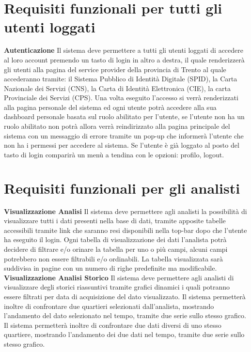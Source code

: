     \section{Requisiti funzionali per tutti gli utenti loggati}
        \begin{rfList}
            \rfItem \textbf{Autenticazione} Il sistema deve permettere a tutti gli utenti loggati di accedere al loro account premendo un tasto di login in altro a destra, il quale renderizzerà gli utenti alla pagina del service provider della provincia di Trento al quale accederanno tramite: il Sistema Pubblico di Identità Digitale (SPID), la Carta Nazionale dei Servizi (CNS), la Carta di Identità Elettronica (CIE), la carta Provinciale dei Servizi (CPS). Una volta eseguito l'accesso si verrà renderizzati alla pagina personale del sistema ed ogni utente potrà accedere alla sua dashboard personale basata sul ruolo abilitato per l'utente, se l'utente non ha un ruolo abilitato non potrà allora verrà reindirizzato alla pagina principale del sistema con un messaggio di errore tramite un pop-up che informerà l'utente che non ha i permessi per accedere al sistema. Se l'utente è già loggato al posto del tasto di login comparirà un menù a tendina con le opzioni: profilo, logout.
        \end{rfList}
    \section{Requisiti funzionali per gli analisti}
        \begin{rfList}
            \rfItem \textbf{Visualizzazione Analisi} Il sistema deve permettere agli analisti la possibilità di visualizzare tutti i dati presenti nella base di dati, tramite apposite tabelle accessibili tramite link che saranno resi disponibili nella top-bar dopo che l'utente ha eseguito il login. Ogni tabella di visualizzazione dei dati l'analista potrà decidere di filtrare e/o orinare la tabella per uno o più campi, alcuni campi potrebbero non essere filtrabili e/o ordinabili. La tabella visualizzata sarà suddivisa in pagine con un numero di righe predefinite ma modificabile.
            \rfItem \textbf{Visualizzazione Analisi Storico} Il sistema deve permettere agli analisti di visualizzare degli storici riassuntivi tramite grafici dinamici i quali potranno essere filtrati per data di acquisizione del dato visualizzato. Il sistema permetterà inoltre di confrontare due quartieri selezionati dall'analista, mostrando l'andamento del dato selezionato nel tempo, tramite due serie sullo stesso grafico. Il sistema permetterà inoltre di confrontare due dati diversi di uno stesso quartiere, mostrando l'andamento dei due dati nel tempo, tramite due serie sullo stesso grafico. 
        \end{rfList}
